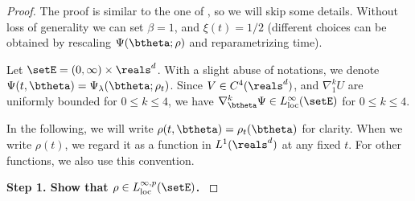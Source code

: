 \documentclass[11pt]{article}
\begin{document}
\begin{proof}
The proof is similar to the one of \cite[Theorem 5.1]{jordan1998variational}, so we will skip some details. Without loss of generality we can set $\beta = 1$,
and $\xi(t)=1/2$ (different choices can be obtained by rescaling $\Psi(\btheta;\rho)$ and reparametrizing time).

Let $\setE = (0, \infty) \times \reals^d$. With a slight abuse of notations, we denote $\Psi(t, \btheta) = \Psi_\lambda(\btheta; \rho_t)$. Since $V \in C^4(\reals^d)$, and $\nabla_1^k U$ are uniformly bounded for $0 \le k \le 4$, we have $\nabla_\btheta^k \Psi \in L_{\rm loc}^\infty(\setE)$ for $0 \le k \le 4$.  

In the following, we will write $\rho(t, \btheta) = \rho_t(\btheta)$ for clarity. When we write $\rho(t)$, we regard it as a function in $L^1(\reals^d)$ at any fixed $t$. For other functions, we also use this convention. 


\noindent
{\bf Step 1. Show that $\rho \in L^{\infty, p}_{\rm loc}(\setE)$. }


\end{proof}
\end{document}
